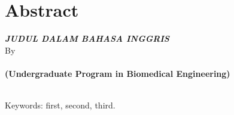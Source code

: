 \clearpage
\chapter*{Abstract}

\begin{center}
	\linespread{1}
	\large{\bfseries{
			\MakeUppercase{\textit{Judul dalam Bahasa Inggris}}
		}
	}\\[1\baselineskip]
	\normalsize{By\\}
	\large{ 
		\bfseries \theauthor\\
		(Undergraduate Program in Biomedical Engineering)
	}\\[2\baselineskip]
\end{center}
\begin{spacing}{1.0}
	\itshape{
		\blindtext
		
		\blindtext
		\\[1.67\baselineskip]
		Keywords: first, second, third.
	}
\end{spacing}

\clearpage
